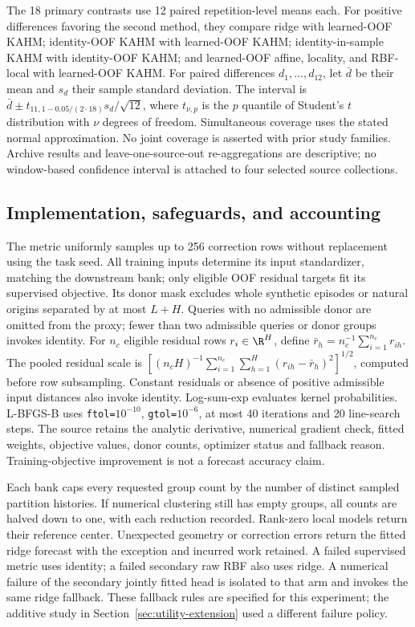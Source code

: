 The 18 primary contrasts use 12 paired repetition-level means each.
For positive differences favoring the second method, they compare
ridge with learned-OOF KAHM; identity-OOF KAHM with learned-OOF KAHM;
identity-in-sample KAHM with identity-OOF KAHM; and learned-OOF affine,
locality, and RBF-local with learned-OOF KAHM. For paired differences $d_1,\ldots,d_{12}$, let $\bar d$ be their
mean and $s_d$ their sample standard deviation. The interval is
$\bar d\pm t_{11,1-0.05/(2\cdot18)}s_d/\sqrt{12}$, where
$t_{\nu,p}$ is the $p$ quantile of Student's $t$ distribution with
$\nu$ degrees of freedom. Simultaneous coverage uses the stated
normal approximation. No joint coverage is asserted with prior study
families. Archive results and leave-one-source-out re-aggregations are
descriptive; no window-based confidence interval is attached to four
selected source collections.

\subsection{Implementation, safeguards, and accounting}
\label{app:target-implementation}

The metric uniformly samples up to 256 correction rows without
replacement using the task seed. All training inputs determine its
input standardizer, matching the downstream bank; only eligible OOF
residual targets fit its supervised objective. Its donor mask excludes
whole synthetic episodes or natural origins separated by at most
$L+H$. Queries with no admissible donor are omitted from the proxy;
fewer than two admissible queries or donor groups invokes identity.
For $n_c$ eligible residual rows $r_i\in\R^H$, define
$\bar r_h=n_c^{-1}\sum_{i=1}^{n_c}r_{ih}$. The pooled residual scale is
$[ (n_cH)^{-1}\sum_{i=1}^{n_c}\sum_{h=1}^{H}(r_{ih}-\bar r_h)^2]^{1/2}$,
computed before row subsampling.
Constant residuals or absence of positive admissible input distances
also invoke identity. Log-sum-exp evaluates kernel probabilities.
L-BFGS-B uses \texttt{ftol=$10^{-10}$},
\texttt{gtol=$10^{-6}$}, at most 40 iterations and 20 line-search
steps. The source retains the analytic derivative, numerical gradient
check, fitted weights, objective values, donor counts, optimizer status
and fallback reason. Training-objective improvement is not a forecast
accuracy claim.

Each bank caps every requested group count by the number of distinct
sampled partition histories. If numerical clustering still has empty
groups, all counts are halved down to one, with each reduction recorded.
Rank-zero local models return their reference center.
Unexpected geometry or correction errors return the fitted ridge
forecast with the exception and incurred work retained. A failed
supervised metric uses identity; a failed secondary raw RBF also uses
ridge. A numerical failure of the secondary jointly fitted head is
isolated to that arm and invokes the same ridge fallback. These fallback rules are specified for this experiment; the additive
study in Section~\ref{sec:utility-extension} used a different failure policy.


